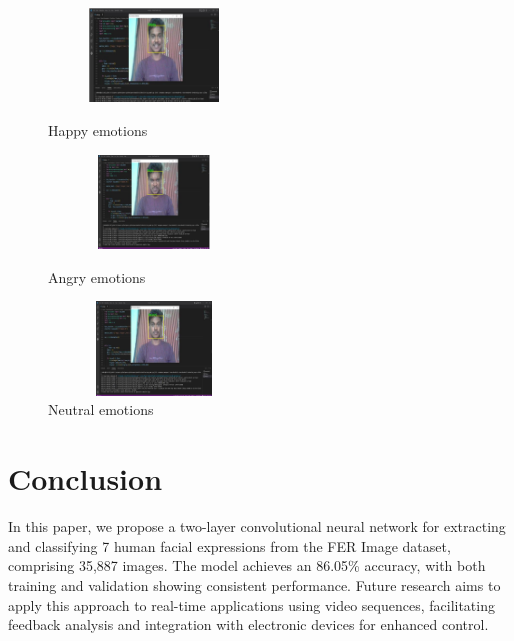 \documentclass[conference]{IEEEtran}
\begin{document}
\begin{figure}[h]
    \centering
    \begin{minipage}[b]{0.25\textwidth}
        \centering
        \includegraphics[width=0.5\textwidth, height=2.5cm]{happy.png}
        \caption{Happy emotions}
        \label{fig:happy}
    \end{minipage}
    \hspace{0.1\textwidth}
    \begin{minipage}[b]{0.25\textwidth}
        \centering
        \includegraphics[width=0.5\textwidth, height=2.5cm]{angry.png}
        \caption{Angry emotions}
        \label{fig:angry}
    \end{minipage}
    \begin{minipage}[b]{0.25\textwidth}
        \centering
        \includegraphics[width=0.5\textwidth, height=2.5cm]{neutral.png}
        \caption{Neutral emotions}
        \label{fig:neutral}
    \end{minipage}
\end{figure}

\section{Conclusion}
In this paper, we propose a two-layer convolutional neural network for extracting and classifying 7 human facial expressions from the FER Image dataset, comprising 35,887 images. The model achieves an 86.05\% accuracy, with both training and validation showing consistent performance. Future research aims to apply this approach to real-time applications using video sequences, facilitating feedback analysis and integration with electronic devices for enhanced control.
\end{document}
